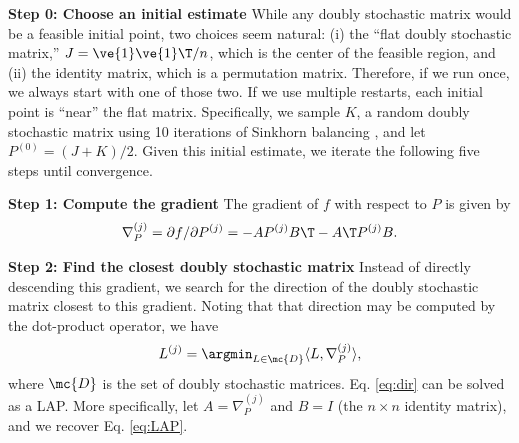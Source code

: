 \documentclass[10pt,journal,cspaper,compsoc]{IEEEtran}
\begin{document}
\textbf{Step 0: Choose an initial estimate} While any doubly stochastic matrix would be a feasible initial point, two choices seem natural: (i) the ``flat doubly  stochastic matrix,'' $J=\ve{1} \ve{1}\T/n$, which is the center of the feasible region, and (ii) the identity matrix, which is a permutation matrix.  Therefore, if we run \qap  once, we always start with one of those two.  If we use multiple restarts, each initial point is ``near'' the flat matrix.  Specifically, we sample $K$, a random doubly stochastic matrix using 10 iterations of Sinkhorn balancing \cite{Sinkhorn1964}, and let $P^{(0)}=(J+K)/2$. Given this initial estimate, we iterate the following five steps until convergence.

\textbf{Step 1: Compute the gradient} The gradient of $f$ with respect to $P$ is given by
\begin{align} \label{eq:grad}
	\nabla_P^{(j)} = \partial f / \partial P^{(j)} =  - A P^{(j)} B\T - A\T P^{(j)} B.
\end{align}


\textbf{Step 2: Find the closest doubly stochastic matrix} Instead of directly descending this gradient, we search for the direction of the doubly stochastic matrix closest to this gradient. Noting that that direction may be computed by the dot-product operator, we have
\begin{align}\label{eq:dir}
	L^{(j)} = \argmin_{L \in \mc{D}} \langle L, \nabla_P^{(j)} \rangle, %
\end{align}
where $\mc{D}$ is the set of doubly stochastic matrices.  Eq. \eqref{eq:dir} can be solved as a LAP.  More specifically, let $A=\nabla_P^{(j)}$ and $B=I$ (the $n\times n$ identity matrix), and we recover Eq. \eqref{eq:LAP}.
\end{document}
